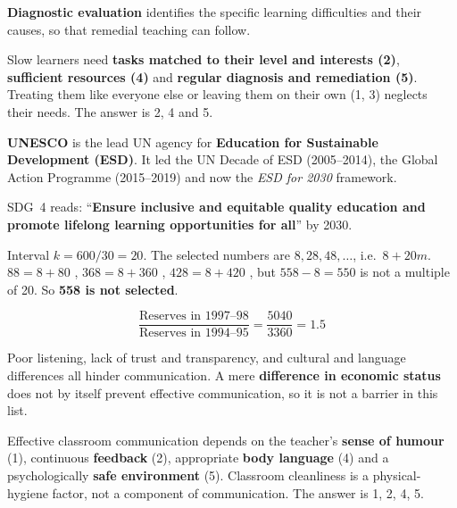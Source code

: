 \textbf{Diagnostic evaluation} identifies the specific learning difficulties and their causes, so that remedial teaching can follow.

Slow learners need \textbf{tasks matched to their level and interests (2)}, \textbf{sufficient resources (4)} and \textbf{regular diagnosis and remediation (5)}. Treating them like everyone else or leaving them on their own (1, 3) neglects their needs. The answer is 2, 4 and 5.

\textbf{UNESCO} is the lead UN agency for \textbf{Education for Sustainable Development (ESD)}. It led the UN Decade of ESD (2005--2014), the Global Action Programme (2015--2019) and now the \emph{ESD for 2030} framework.

SDG~4 reads: ``\textbf{Ensure inclusive and equitable quality education and promote lifelong learning opportunities for all}'' by 2030.

Interval $k=600/30=20$. The selected numbers are $8, 28, 48, \ldots$, i.e.\ $8+20m$.
$88=8+80$ \checkmark, $368=8+360$ \checkmark, $428=8+420$ \checkmark, but $558-8=550$ is not a multiple of 20. So \textbf{558 is not selected}.


\[\frac{\text{Reserves in 1997--98}}{\text{Reserves in 1994--95}}=\frac{5040}{3360}=\mathbf{1.5}\]

Poor listening, lack of trust and transparency, and cultural and language differences all hinder communication. A mere \textbf{difference in economic status} does not by itself prevent effective communication, so it is not a barrier in this list.

Effective classroom communication depends on the teacher's \textbf{sense of humour} (1), continuous \textbf{feedback} (2), appropriate \textbf{body language} (4) and a psychologically \textbf{safe environment} (5). Classroom cleanliness is a physical-hygiene factor, not a component of communication. The answer is 1, 2, 4, 5.

